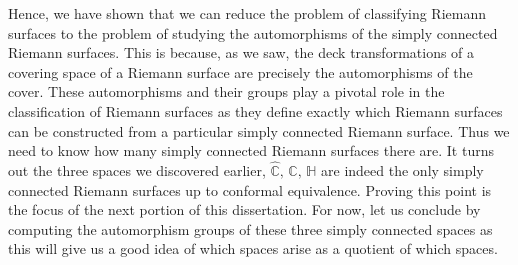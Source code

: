 \documentclass[11pt]{report}
\theoremstyle{definition}
\begin{document}
Hence, we have shown that we can reduce the problem of classifying Riemann surfaces to the problem of studying the automorphisms of the simply connected Riemann surfaces. This is because, as we saw, the deck transformations of a covering space of a Riemann surface are precisely the automorphisms of the cover. These automorphisms and their groups play a pivotal role in the classification of Riemann surfaces as they define exactly which Riemann surfaces can be constructed from a particular simply connected Riemann surface. Thus we need to know how many simply connected Riemann surfaces there are. It turns out the three spaces we discovered earlier, $\widehat{\mathbb{C}},\, \mathbb{C},\,\mathbb{H}$ are indeed the only simply connected Riemann surfaces up to conformal equivalence. Proving this point is the focus of the next portion of this dissertation. For now, let us conclude by computing the automorphism groups of these three simply connected spaces as this will give us a good idea of which spaces arise as a quotient of which spaces.
\end{document}
